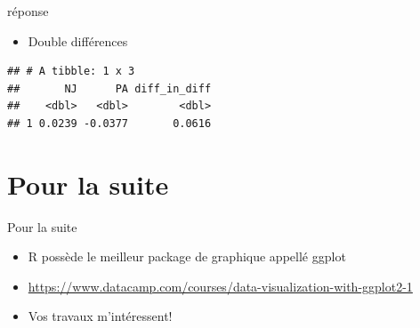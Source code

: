 \documentclass[ignorenonframetext,]{beamer}
\providecommand{\tightlist}{%
  \setlength{\itemsep}{0pt}\setlength{\parskip}{0pt}}
\begin{document}
\begin{frame}[fragile]{réponse}
\protect\hypertarget{reponse-2}{}

\begin{itemize}
\tightlist
\item
  Double différences
\end{itemize}

\begin{verbatim}
## # A tibble: 1 x 3
##       NJ      PA diff_in_diff
##    <dbl>   <dbl>        <dbl>
## 1 0.0239 -0.0377       0.0616
\end{verbatim}

\end{frame}

\hypertarget{pour-la-suite}{%
\section{Pour la suite}\label{pour-la-suite}}

\begin{frame}{Pour la suite}
\protect\hypertarget{pour-la-suite-1}{}

\begin{itemize}
\item
  R possède le meilleur package de graphique appellé ggplot
\item
  \url{https://www.datacamp.com/courses/data-visualization-with-ggplot2-1}
\item
  Vos travaux m'intéressent!
\end{itemize}

\end{frame}
\end{document}
